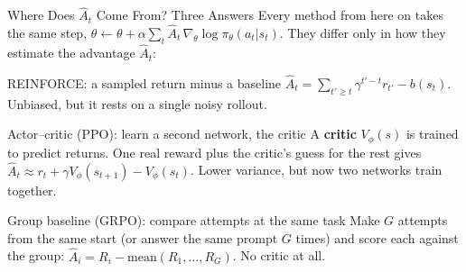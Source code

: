 \begin{frame}{Where Does $\hat{A}_t$ Come From? Three Answers}
Every method from here on takes the same step, $\theta \leftarrow \theta + \alpha \sum_t \hat{A}_t\, \nabla_\theta \log \pi_\theta(a_t|s_t)$. They differ only in how they estimate the advantage $\hat{A}_t$:
\vspace{0.3em}
\begin{block}{REINFORCE: a sampled return minus a baseline}
$\hat{A}_t = \sum_{t' \geq t} \gamma^{t'-t} r_{t'} - b(s_t)$. Unbiased, but it rests on a single noisy rollout.
\end{block}
\pause
\begin{block}{Actor--critic (PPO): learn a second network, the critic}
A \textbf{critic} $V_\phi(s)$ is trained to predict returns. One real reward plus the critic's guess for the rest gives $\hat{A}_t \approx r_t + \gamma V_\phi(s_{t+1}) - V_\phi(s_t)$. Lower variance, but now two networks train together.
\end{block}
\pause
\begin{block}{Group baseline (GRPO): compare attempts at the same task}
Make $G$ attempts from the same start (or answer the same prompt $G$ times) and score each against the group: $\hat{A}_i = R_i - \mathrm{mean}(R_1, \dots, R_G)$. No critic at all.
\end{block}
\end{frame}
